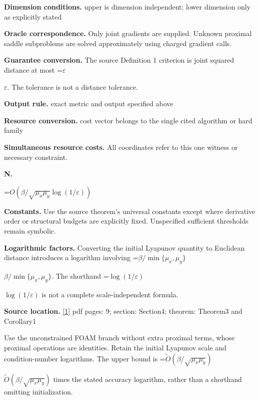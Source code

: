 \documentclass[10pt,a4paper]{article}
\newcommand{\AtlasMath}[1]{\par\begingroup\centering\setbox0=\hbox{$\displaystyle #1$}\ifdim\wd0>1.4\linewidth\typeout{ATLAS WIDE FORMULA: \the\wd0}\fi\ifdim\wd0>\linewidth\resizebox{\linewidth}{!}{\box0}\else\box0\fi\par\endgroup}
\newcommand{\AtlasInlineMath}[1]{\begingroup\setbox0=\hbox{$#1$}\ifdim\wd0>.4\linewidth\endgroup\AtlasMath{#1}\else\endgroup$#1$\fi}
\begin{document}
\textbf{Dimension conditions.} upper is dimension independent; lower dimension only as explicitly stated



\textbf{Oracle correspondence.} Only joint gradients are supplied. Unknown proximal saddle subproblems are solved approximately using charged gradient calls.



\textbf{Guarantee conversion.} The source Definition 1 criterion is joint squared distance at most \AtlasInlineMath{\varepsilon}. The tolerance is not a distance tolerance.



\textbf{Output rule.} exact metric and output specified above



\textbf{Resource conversion.} cost vector belongs to the single cited algorithm or hard family



\textbf{Simultaneous resource costs.} All coordinates refer to this one witness or necessary constraint.



\textbf{N.}



\AtlasMath{O(\beta/\sqrt{\mu_x\mu_y}\log(1/\varepsilon))}


\textbf{Constants.} Use the source theorem’s universal constants except where derivative order or structural budgets are explicitly fixed. Unspecified sufficient thresholds remain symbolic.



\textbf{Logarithmic factors.} Converting the initial Lyapunov quantity to Euclidean distance introduces a logarithm involving \AtlasInlineMath{\beta/\min\{\mu_x,\mu_y\}}. The shorthand \AtlasInlineMath{\log(1/\varepsilon)} is not a complete scale-independent formula.



\textbf{Source location.} \href{https://arxiv.org/pdf/2205.05653v1}{[1]} pdf pages: 9; section: Section4; theorem: Theorem3 and Corollary1



Use the unconstrained FOAM branch without extra proximal terms, whose proximal operations are identities. Retain the initial Lyapunov scale and condition-number logarithms. The upper bound is \AtlasInlineMath{\widetilde O(\beta/\sqrt{\mu_x\mu_y})} times the stated accuracy logarithm, rather than a shorthand omitting initialization.
\end{document}
